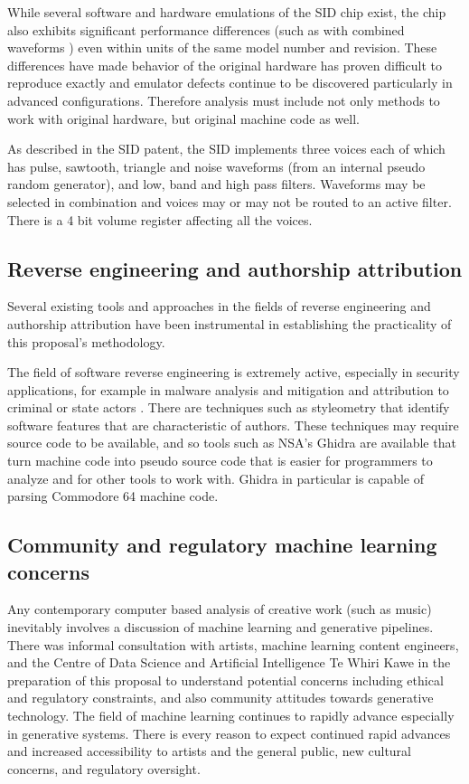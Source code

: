 \documentclass[10pt]{article}
\begin{document}
\begin{multicols*}{2}
While several software and hardware emulations of the SID chip exist, the chip also exhibits significant performance differences (such as with combined waveforms \cite{fixcombwaveforms}) even within units of the same model number and revision. These differences have made behavior of the original hardware has proven difficult to reproduce exactly and emulator defects continue to be discovered particularly in advanced configurations. Therefore analysis must include not only methods to work with original hardware, but original machine code as well.

As described in the SID patent\cite{sidpatent}, the SID implements three voices each of which has pulse, sawtooth, triangle and noise waveforms (from an internal pseudo random generator), and low, band and high pass filters. Waveforms may be selected in combination and voices may or may not be routed to an active filter. There is a 4 bit volume register affecting all the voices.

\subsection{Reverse engineering and authorship attribution}

Several existing tools and approaches in the fields of reverse engineering and authorship attribution have been instrumental in establishing the practicality of this proposal's methodology.

The field of software reverse engineering is extremely active, especially in security applications, for example in malware analysis and mitigation and attribution to criminal or state actors \cite{mohammed2022malgridvisualizationbinaryfeatures}. There are techniques such as styleometry\cite{10.1145/3292577} that identify software features that are characteristic of authors. These techniques may require source code to be available, and so tools such as NSA's Ghidra\cite{ghidra} are available that turn machine code into pseudo source code that is easier for programmers to analyze and for other tools to work with. Ghidra in particular is capable of parsing Commodore 64 machine code.

\subsection{Community and regulatory machine learning concerns}

Any contemporary computer based analysis of creative work (such as music) inevitably involves a discussion of machine learning and generative pipelines. There was informal consultation with artists, machine learning content engineers, and the Centre of Data Science and Artificial Intelligence Te Whiri Kawe in the preparation of this proposal to understand potential concerns including ethical and regulatory constraints, and also community attitudes towards generative technology. The field of machine learning continues to rapidly advance especially in generative systems. There is every reason to expect continued rapid advances and increased accessibility to artists and the general public, new cultural concerns, and regulatory oversight.


\end{multicols*}
\end{document}
